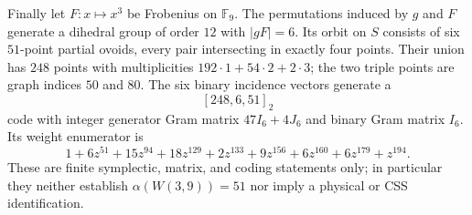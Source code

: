 Finally let $F:x\mapsto x^3$ be Frobenius on $\mathbb F_9$.  The permutations induced by $g$ and $F$ generate a dihedral group of order $12$ with $|gF|=6$.  Its orbit on $S$ consists of six $51$-point partial ovoids, every pair intersecting in exactly four points.  Their union has $248$ points with multiplicities $192\cdot1+54\cdot2+2\cdot3$; the two triple points are graph indices $50$ and $80$.  The six binary incidence vectors generate a
\[
 \boxed{[248,6,51]_2}
\]
code with integer generator Gram matrix $47I_6+4J_6$ and binary Gram matrix $I_6$.  Its weight enumerator is
\[
1+6z^{51}+15z^{94}+18z^{129}+2z^{133}+9z^{156}+6z^{160}+6z^{179}+z^{194}.
\]
These are finite symplectic, matrix, and coding statements only; in particular they neither establish $\alpha(W(3,9))=51$ nor imply a physical or CSS identification.
